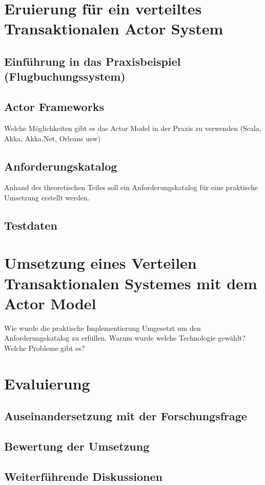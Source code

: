 
\chapter{Eruierung für ein verteiltes Transaktionalen Actor System }
\section{Einführung in das Praxisbeispiel (Flugbuchungssystem)}
\section{Actor Frameworks}\label{sec:ActorFrameworks}
Welche Möglichkeiten gibt es das Actor Model in der Praxis zu verwenden (Scala, Akka, Akka.Net, Orleans usw)

\section{Anforderungskatalog}
Anhand des theoretischen Teiles soll ein Anforderungskatalog für eine praktische Umsetzung erstellt werden.

\section{Testdaten}

\chapter{Umsetzung eines Verteilen Transaktionalen Systemes mit dem Actor Model}
Wie wurde die praktische Implementierung Umgesetzt um den Anforderungskatalog zu erfüllen. Warum wurde welche Technologie gewählt? Welche Probleme gibt es? 

\chapter{Evaluierung}
\section{Auseinandersetzung mit der Forschungsfrage}
\section{Bewertung der Umsetzung}
\section{Weiterführende Diskussionen}
